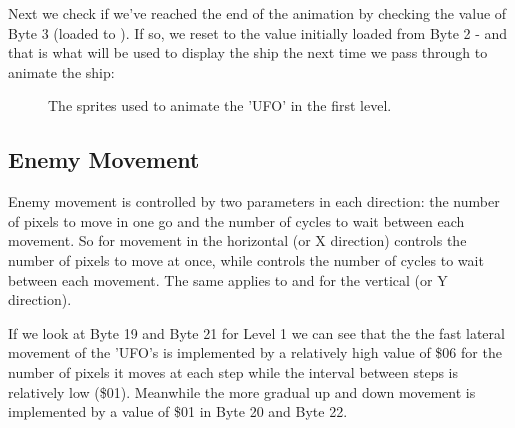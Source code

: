 %


Next we check if we've reached the end of the animation by checking the value
of Byte 3 (loaded to ).  If so,
we reset  to the value initially
loaded from Byte 2 - and that is what will be used to display the ship the next
time we pass through to animate the ship:

%


\begin{figure}[H]
  {
    \setlength{\tabcolsep}{3.0pt}
    \setlength\cmidrulewidth{\heavyrulewidth} %
	\centering
	\begin{subfigure}{0.3\textwidth}
		
	\end{subfigure}
	\begin{subfigure}{0.3\textwidth}
		
	\end{subfigure}
	\begin{subfigure}{0.3\textwidth}
		
	\end{subfigure}
  }\caption[position=top]{The sprites used to animate the 'UFO' in the first level.}
\end{figure}

\subsection{Enemy Movement}

Enemy movement is controlled by two parameters in each direction: the number of pixels to move in one go and the number of
cycles to wait between each movement. So for movement in the horizontal (or X direction)  controls the number
of pixels to move at once, while  controls the number of cycles to wait between each movement. The same
applies to  and  for the vertical (or Y direction).

If we look at Byte 19 and Byte 21 for Level 1 we can see that the the fast lateral movement of the 'UFO's is implemented by a relatively
high value of \$06 for the number of pixels it moves at each step while the interval between steps is relatively low (\$01).
Meanwhile the more gradual up and down movement is implemented by a value of \$01 in Byte 20 and Byte 22.

